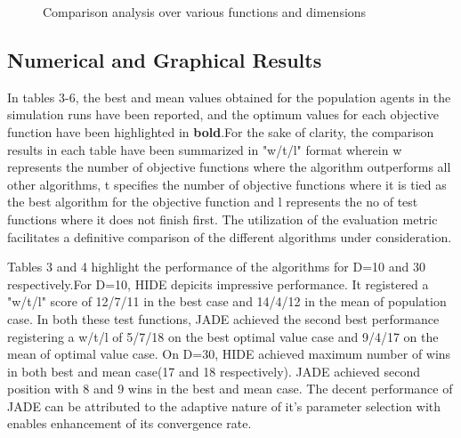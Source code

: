 \begin{figure*}[h!]
    \caption{Comparison analysis over various functions and dimensions}
    \vspace{-4mm}
\end{figure*}


\subsection{Numerical and Graphical Results} 
In tables 3-6, the best and mean values obtained for the population agents in the simulation runs have been reported, and the optimum values for each objective function have been highlighted in \textbf{bold}.For the sake of clarity, the comparison results in each table have been summarized in "w/t/l" format wherein w represents the number of objective functions where the algorithm outperforms all other algorithms, t specifies the number of objective functions where it is tied as the best algorithm for the objective function and l represents the no of test functions where it does not finish first. The utilization of the evaluation metric facilitates a definitive comparison of the different algorithms under consideration.

Tables 3 and 4 highlight the performance of the algorithms for D=10 and 30 respectively.For D=10, HIDE depicits impressive performance. It registered a "w/t/l" score of 12/7/11 in the best case and 14/4/12 in the mean of population case. In both these test functions, JADE achieved the second best performance registering a w/t/l of 5/7/18 on the best optimal value case and 9/4/17 on the mean of optimal value case. On D=30, HIDE achieved maximum number of wins in both best and mean case(17 and 18 respectively). JADE achieved second position with 8 and 9 wins in the best and mean case. The decent performance of JADE can be attributed to the adaptive nature of it's parameter selection with enables enhancement of its convergence rate.

